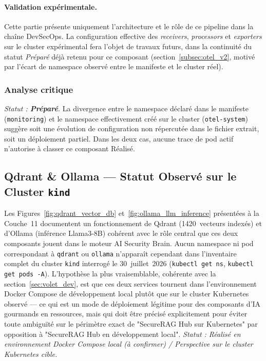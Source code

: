 \paragraph{Validation expérimentale.} Cette partie présente uniquement l'architecture et le rôle de ce pipeline dans la chaîne DevSecOps. La configuration effective des \textit{receivers}, \textit{processors} et \textit{exporters} sur le cluster expérimental fera l'objet de travaux futurs, dans la continuité du statut \textit{Préparé} déjà retenu pour ce composant (section~\ref{subsec:otel_v2}, motivé par l'écart de namespace observé entre le manifeste et le cluster réel).

\subsubsection{Analyse critique}
\textit{Statut : \textbf{Préparé}.} La divergence entre le namespace déclaré dans le manifeste (\texttt{monitoring}) et le namespace effectivement créé sur le cluster (\texttt{otel-system}) suggère soit une évolution de configuration non répercutée dans le fichier extrait, soit un déploiement partiel. Dans les deux cas, aucune trace de pod actif n'autorise à classer ce composant Réalisé.

\subsection{Qdrant \& Ollama — Statut Observé sur le Cluster \texttt{kind}}
\label{subsec:qdrant_ollama_v2}

Les Figures~\ref{fig:qdrant_vector_db} et~\ref{fig:ollama_llm_inference} présentées à la Couche~11 documentent un fonctionnement de Qdrant (1420~vecteurs indexés) et d'Ollama (inférence Llama3-8B) cohérent avec le rôle central que ces deux composants jouent dans le moteur AI Security Brain. Aucun namespace ni pod correspondant à \texttt{qdrant} ou \texttt{ollama} n'apparaît cependant dans l'inventaire complet du cluster \texttt{kind} interrogé le 30~juillet~2026 (\texttt{kubectl get ns}, \texttt{kubectl get pods -A}). L'hypothèse la plus vraisemblable, cohérente avec la section~\ref{sec:volet_dev}, est que ces deux services tournent dans l'environnement Docker Compose de développement local plutôt que sur le cluster Kubernetes observé — ce qui est un mode de déploiement légitime pour des composants d'IA gourmands en ressources, mais qui doit être précisé explicitement pour éviter toute ambiguïté sur le périmètre exact de "SecureRAG Hub sur Kubernetes" par opposition à "SecureRAG Hub en développement local". \textit{Statut : Réalisé en environnement Docker Compose local (à confirmer) / Perspective sur le cluster Kubernetes cible.}

